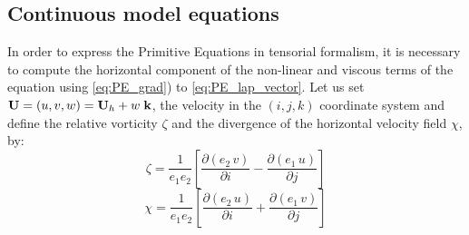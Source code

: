 \documentclass[../main/NEMO_manual]{subfiles}
\begin{document}
\subsection{Continuous model equations}
\label{subsec:PE_zco_Eq}

In order to express the Primitive Equations in tensorial formalism,
it is necessary to compute the horizontal component of the non-linear and viscous terms of the equation using
\autoref{eq:PE_grad}) to \autoref{eq:PE_lap_vector}.
Let us set $\mathbf{U}=(u,v,w)={\mathbf{U}}_h +w\;\mathbf{k}$, the velocity in the $(i,j,k)$ coordinate system and
define the relative vorticity $\zeta$ and the divergence of the horizontal velocity field $\chi$, by:
\begin{equation}
  \label{eq:PE_curl_Uh}
  \zeta =\frac{1}{e_1 e_2 }\left[ {\frac{\partial \left( {e_2 \,v}
        \right)}{\partial i}-\frac{\partial \left( {e_1 \,u} \right)}{\partial j}}
  \right]
\end{equation}
\begin{equation}
  \label{eq:PE_div_Uh}
  \chi =\frac{1}{e_1 e_2 }\left[ {\frac{\partial \left( {e_2 \,u}
        \right)}{\partial i}+\frac{\partial \left( {e_1 \,v} \right)}{\partial j}}
  \right]
\end{equation}
\end{document}
